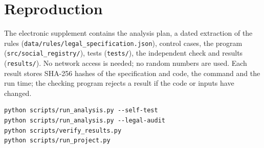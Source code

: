 \documentclass[12pt,a4paper]{extarticle}
\begin{document}
\appendix
\section{Reproduction}
The electronic supplement contains the analysis plan, a dated extraction of the rules (\nolinkurl{data/rules/legal_specification.json}), control cases, the program (\nolinkurl{src/social_registry/}), tests (\nolinkurl{tests/}), the independent check and results (\nolinkurl{results/}). No network access is needed; no random numbers are used. Each result stores SHA-256 hashes of the specification and code, the command and the run time; the checking program rejects a result if the code or inputs have changed.

\begingroup\fontsize{11bp}{13.2bp}\selectfont
\begin{verbatim}
python scripts/run_analysis.py --self-test
python scripts/run_analysis.py --legal-audit
python scripts/verify_results.py
python scripts/run_project.py
\end{verbatim}
\endgroup
\end{document}
